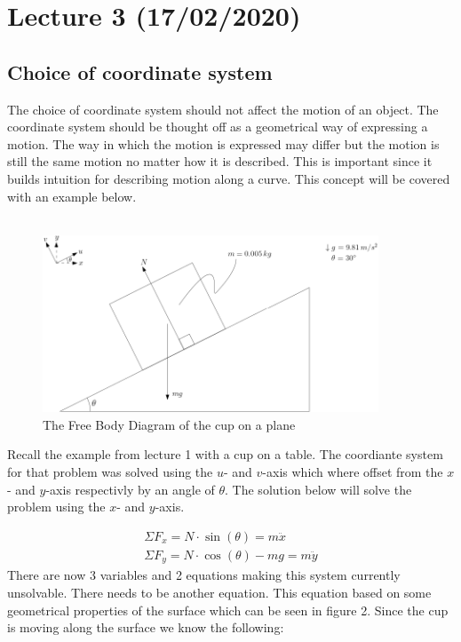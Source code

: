 \documentclass[11pt, a4paper]{article}
\begin{document}
\setcounter{section}{2}
\section{Lecture 3 (17/02/2020)}
\subsection{Choice of coordinate system}
The choice of coordinate system should not affect the motion of an object. The coordinate system should be thought
off as a geometrical way of expressing a motion. The way in which the motion is expressed may differ but the motion
is still the same motion no matter how it is described. This is important since it builds intuition for describing
motion along a curve. This concept will be covered with an example below.\\
\\
\begin{figure}[h]
    \centerline{\includegraphics[width=10cm]{images/Crate_No_Friction.png}}
    \caption{The Free Body Diagram of the cup on a plane}
\end{figure}

Recall the example from lecture 1 with a cup on a table. The coordiante system for that problem was solved using 
the $u$- and $v$-axis which where offset from the $x$- and $y$-axis respectivly by an angle of $\theta$. The solution below
will solve the problem using the $x$- and $y$-axis.

\begin{gather}
    \Sigma F_x = N \cdot \sin(\theta) = m\ddot{x} \\
    \Sigma F_y = N \cdot \cos(\theta) - mg = m\ddot{y}
\end{gather}
There are now 3 variables and 2 equations making this system currently unsolvable. There needs to be another equation.
This equation based on some geometrical properties of the surface which can be seen in figure 2. 
Since the cup is moving along the surface we know the following:
\end{document}
